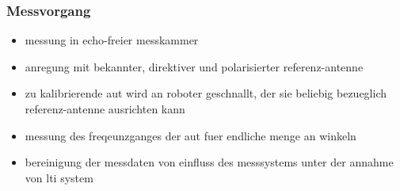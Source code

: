 \subsubsection{Messvorgang}
\begin{itemize}
    \item messung in echo-freier messkammer
    \item anregung mit bekannter, direktiver und polarisierter referenz-antenne
    \item zu kalibrierende \gls{aut} wird an roboter geschnallt, der sie beliebig bezueglich referenz-antenne ausrichten kann
    \item messung des freqeunzganges der \gls{aut} fuer endliche menge an winkeln
    \item bereinigung der messdaten von einfluss des messsystems unter der annahme von \gls{lti} system
\end{itemize}

